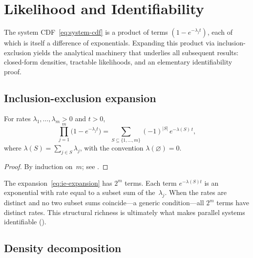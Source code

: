 \section{Likelihood and Identifiability}
\label{sec:likelihood}

The system CDF~\eqref{eq:system-cdf} is a product of terms
$(1 - e^{-\lambda_j t})$, each of which is itself a difference of
exponentials.  Expanding this product via inclusion-exclusion yields the
analytical machinery that underlies all subsequent results: closed-form
densities, tractable likelihoods, and an elementary identifiability proof.

\subsection{Inclusion-exclusion expansion}
\label{sec:ie-expansion}

\begin{lemma}\label{lem:ie}
  For rates $\lambda_1, \ldots, \lambda_m > 0$ and $t > 0$,
  \begin{equation}\label{eq:ie-expansion}
    \prod_{j=1}^m \bigl(1 - e^{-\lambda_j t}\bigr)
    = \sum_{S \subseteq \{1,\ldots,m\}} (-1)^{|S|}\, e^{-\lambda(S)\, t},
  \end{equation}
  where $\lambda(S) = \sum_{j \in S} \lambda_j$, with the convention
  $\lambda(\varnothing) = 0$.
\end{lemma}

\begin{proof}
By induction on~$m$; see .
\end{proof}

\begin{remark}\label{rmk:ie-terms}
The expansion~\eqref{eq:ie-expansion} has $2^m$ terms.  Each term
$e^{-\lambda(S) t}$ is an exponential with rate equal to a subset sum of
the~$\lambda_j$.  When the rates are distinct and no two subset sums
coincide---a generic condition---all $2^m$ terms have distinct rates.
This structural richness is ultimately what makes parallel systems
identifiable ().
\end{remark}

\subsection{Density decomposition}
\label{sec:density-decomp}

